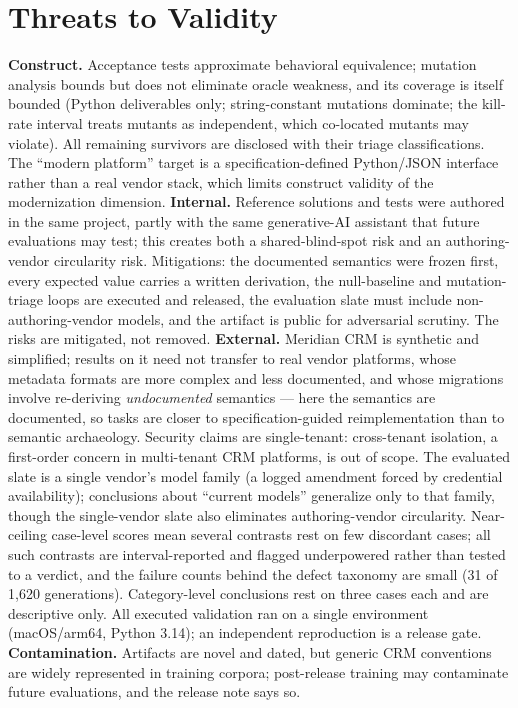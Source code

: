 \documentclass{ieeetj}
\begin{document}
\section{Threats to Validity}
\label{sec:threats}
\textbf{Construct.} Acceptance tests approximate behavioral equivalence; mutation analysis
bounds but does not eliminate oracle weakness, and its coverage is itself bounded (Python
deliverables only; string-constant mutations dominate; the kill-rate interval treats mutants
as independent, which co-located mutants may violate). All remaining survivors are disclosed with their triage classifications. The
``modern platform'' target is a specification-defined Python/JSON interface rather than a
real vendor stack, which limits construct validity of the modernization dimension.
\textbf{Internal.} Reference solutions and tests were authored in the same project, partly
with the same generative-AI assistant that future evaluations may test; this creates both a
shared-blind-spot risk and an authoring-vendor circularity risk. Mitigations: the documented
semantics were frozen first, every expected value carries a written derivation, the
null-baseline and mutation-triage loops are executed and released, the evaluation slate must
include non-authoring-vendor models, and the artifact is public for adversarial scrutiny.
The risks are mitigated, not removed. \textbf{External.} Meridian CRM is synthetic and
simplified; results on it need not transfer to real vendor platforms, whose metadata formats
are more complex and less documented, and whose migrations involve re-deriving
\emph{undocumented} semantics --- here the semantics are documented, so tasks are closer to
specification-guided reimplementation than to semantic archaeology. Security claims are
single-tenant: cross-tenant isolation, a first-order concern in multi-tenant CRM platforms,
is out of scope. The evaluated slate is a single vendor's model family (a logged amendment
forced by credential availability); conclusions about ``current models'' generalize only to
that family, though the single-vendor slate also eliminates authoring-vendor circularity.
Near-ceiling case-level scores mean several contrasts rest on few discordant cases; all such
contrasts are interval-reported and flagged underpowered rather than tested to a verdict,
and the failure counts behind the defect taxonomy are small (31 of 1{,}620 generations).
Category-level conclusions rest on three cases each and are descriptive only. All executed
validation ran on a single environment (macOS/arm64, Python 3.14); an independent
reproduction is a release gate. \textbf{Contamination.} Artifacts are novel and
dated, but generic CRM conventions are widely represented in training corpora; post-release
training may contaminate future evaluations, and the release note says so.
\end{document}

